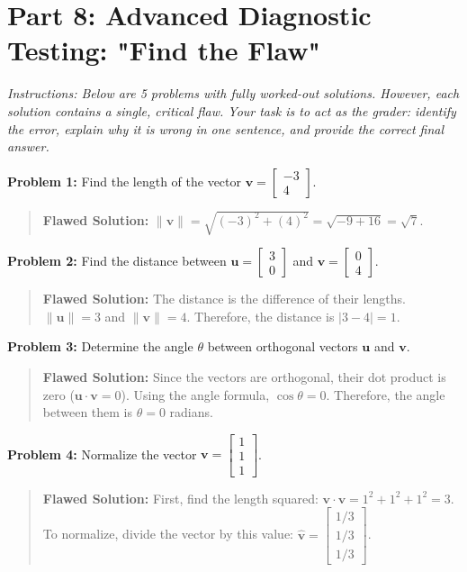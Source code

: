 \documentclass[11pt, letterpaper]{article}
\theoremstyle{definition}
\theoremstyle{remark}
\begin{document}
\newpage
\section{Part 8: Advanced Diagnostic Testing: "Find the Flaw"}

\textit{Instructions: Below are 5 problems with fully worked-out solutions. However, each solution contains a single, critical flaw. Your task is to act as the grader: identify the error, explain why it is wrong in one sentence, and provide the correct final answer.}

\vspace{1em}
\textbf{Problem 1:} Find the length of the vector $\mathbf{v} = \begin{bmatrix} -3 \\ 4 \end{bmatrix}$.
\begin{quote}
\textbf{Flawed Solution:}
$\|\mathbf{v}\| = \sqrt{(-3)^2 + (4)^2} = \sqrt{-9 + 16} = \sqrt{7}$.
\end{quote}

\textbf{Problem 2:} Find the distance between $\mathbf{u} = \begin{bmatrix} 3 \\ 0 \end{bmatrix}$ and $\mathbf{v} = \begin{bmatrix} 0 \\ 4 \end{bmatrix}$.
\begin{quote}
\textbf{Flawed Solution:}
The distance is the difference of their lengths. $\|\mathbf{u}\| = 3$ and $\|\mathbf{v}\| = 4$. Therefore, the distance is $|3 - 4| = 1$.
\end{quote}

\textbf{Problem 3:} Determine the angle $\theta$ between orthogonal vectors $\mathbf{u}$ and $\mathbf{v}$.
\begin{quote}
\textbf{Flawed Solution:}
Since the vectors are orthogonal, their dot product is zero ($\mathbf{u} \cdot \mathbf{v} = 0$). Using the angle formula, $\cos \theta = 0$. Therefore, the angle between them is $\theta = 0$ radians.
\end{quote}

\textbf{Problem 4:} Normalize the vector $\mathbf{v} = \begin{bmatrix} 1 \\ 1 \\ 1 \end{bmatrix}$.
\begin{quote}
\textbf{Flawed Solution:}
First, find the length squared: $\mathbf{v} \cdot \mathbf{v} = 1^2 + 1^2 + 1^2 = 3$. To normalize, divide the vector by this value: $\mathbf{\hat{v}} = \begin{bmatrix} 1/3 \\ 1/3 \\ 1/3 \end{bmatrix}$.
\end{quote}
\end{document}
